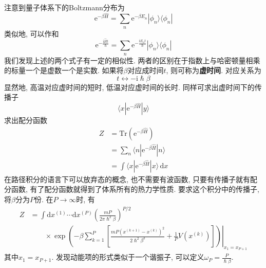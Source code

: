         注意到量子体系下的Boltzmann分布为
        \begin{equation}
            \mathrm{e}^{-\beta \hat{H}} = \sum_n \mathrm{e}^{-\beta E_n} |\phi_n \rangle \langle \phi_n|
        \end{equation}
        类似地, 可以作和
        \begin{equation}
            \mathrm{e}^{-\frac {\mathrm{i}\hat{H}t}{\hslash}} = \sum_n \mathrm{e}^{-\frac {\mathrm{i}E_n t}{\hslash}} |\phi_n \rangle \langle \phi_n|
        \end{equation}
        我们发现上述的两个式子有一定的相似性. 两者的区别在于指数上与哈密顿量相乘的标量一个是虚数一个是实数. 
        如果将$\beta$对应成时间$t$, 则可称为\textbf{虚时间}. 对应关系为
        \begin{equation}
            t \leftrightarrow -\mathrm{i}\hslash \beta
        \end{equation}
        显然地, 高温对应虚时间的短时, 低温对应虚时间的长时. 同样可求出虚时间下的传播子
        \begin{equation}
            \langle x|\mathrm{e}^{-\beta \hat{H}}|y\rangle
        \end{equation}
        求出配分函数
        \begin{equation}\begin{aligned}
            Z &= \mathrm{Tr}(\mathrm{e}^{-\beta \hat{H}}) \\
            &= \sum_n \langle n| \mathrm{e}^{-\beta \hat{H}}|n\rangle \\
            &= \int \langle x|\mathrm{e}^{-\beta \hat{H}}|x\rangle \,\mathrm{d}x
        \end{aligned}\end{equation}
        在路径积分的语言下可以放弃态的概念, 也不需要有波函数, 只要有传播子就有配分函数, 有了配分函数就得到了体系所有的热力学性质. 
        要求这个积分中的传播子, 将$\beta$分为$P$份. 在$P \to \infty$时, 有
        \begin{equation}\begin{aligned}
            Z &= \int \mathrm{d} x^{(1)} \cdots \mathrm{d} x^{(P)} \left(\frac{mP}{2\pi \hslash^2 \beta}\right)^{P/2} \\ & \qquad\times\left.
            \exp\left( -\beta \sum_{k=1}^{P} \left[\frac{mP(x^{(k+1)}-x^{(k)})^2}{2\hslash^2 \beta^2}+\frac{1}{P}V(x^{(k)})\right]\right)\right|_{x_1 = x_{P+1}}
        \end{aligned}\end{equation}
        其中$x_1 = x_{P+1}$. 发现动能项的形式类似于一个谐振子, 可以定义$\omega_P = \frac P{\hslash \beta}$. 

